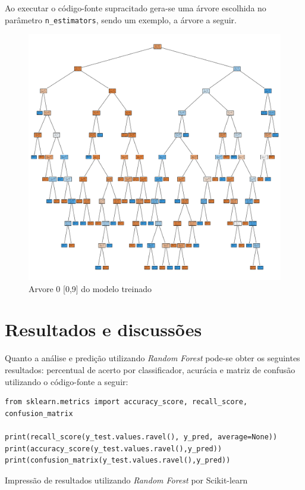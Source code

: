 \documentclass{article}
\begin{document}
Ao executar o código-fonte supracitado gera-se uma árvore escolhida no parâmetro \texttt{n\_estimators}, sendo um exemplo, a árvore a seguir. 

\begin{figure}[H]
\centering
\includegraphics[width=1\textwidth]{tree_0.png}
\caption{Arvore 0 [0,9] do modelo treinado}
\label{Tree}
\end{figure}

\section{Resultados e discussões}



Quanto a análise e predição utilizando \emph{Random Forest} pode-se obter os seguintes resultados: percentual de acerto por classificador, acurácia e matriz de confusão utilizando o código-fonte a seguir: 

\begin{listing}[H]
\begin{verbatim}
from sklearn.metrics import accuracy_score, recall_score, confusion_matrix

print(recall_score(y_test.values.ravel(), y_pred, average=None))
print(accuracy_score(y_test.values.ravel(),y_pred))
print(confusion_matrix(y_test.values.ravel(),y_pred))
\end{verbatim}
\caption{Impressão de resultados utilizando \emph{Random Forest} por Scikit-learn}
\end{listing}
\end{document}
